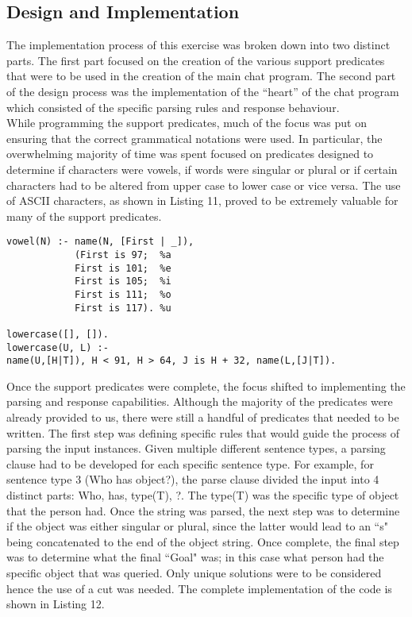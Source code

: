 \documentclass[11pt]{article}
\newcommand{\forceindent}{\leavevmode{\parindent=1em\indent}}
\begin{document}
	\subsection{Design and Implementation}
\forceindent The implementation process of this exercise was broken down into two distinct parts. The first part focused on the creation of the various support predicates that were to be used in the	creation of the main chat program. The second part of the design process was the implementation of the ``heart'' of the chat program which consisted of the specific parsing rules and response behaviour. \\

While programming the support predicates, much of the focus was put on ensuring that the correct grammatical notations were used. In particular, the overwhelming majority of time was spent focused on predicates designed to determine if characters were  vowels, if words were singular or plural or if certain characters had to be altered from upper case to lower case or vice versa. The use of ASCII characters, as shown in Listing 11, proved to be extremely valuable for many of the support predicates.

\begin{lstlisting}[caption= Grammar Predicates using ASCII, label= Listing 11]
vowel(N) :- name(N, [First | _]),
	    	(First is 97;  %a
	    	First is 101;  %e
	    	First is 105;  %i
	    	First is 111;  %o
	    	First is 117). %u
		
lowercase([], []).  
lowercase(U, L) :-
name(U,[H|T]), H < 91, H > 64, J is H + 32, name(L,[J|T]).
\end{lstlisting}

\forceindent Once the support predicates were complete, the focus shifted to implementing the parsing and response capabilities. Although the majority of the predicates were already provided to us, there were still a handful of predicates that needed to be written. The first step was defining specific rules that would guide the process of parsing the input instances. Given multiple different sentence types, a parsing clause had to be developed for each specific sentence type. For example, for sentence type 3 (Who has object?), the parse clause divided the input into 4 distinct parts: Who, has, type(T), ?. The type(T) was the specific type of object that the person had. Once the string was parsed, the next step was to determine if the object was either singular or plural, since the latter would lead to an ``s" being concatenated to the end of the object string. Once complete, the final step was to determine what the final ``Goal" was; in this case what person had the specific object that was queried. Only unique solutions were to be considered hence the use of a cut was needed. The complete implementation of the code is shown in Listing 12.
\end{document}
